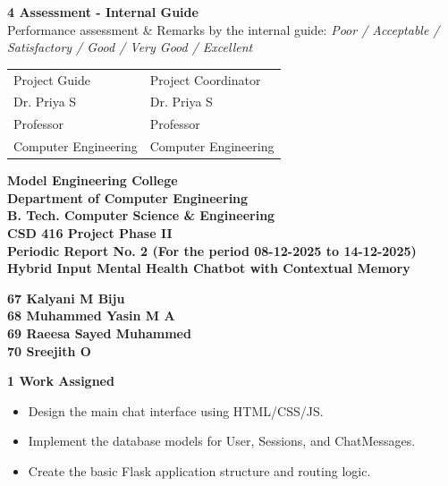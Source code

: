 \documentclass[12pt,a4paper]{article}
\begin{document}
\noindent\textbf{4 \quad Assessment - Internal Guide}\\[0.5em]
Performance assessment \& Remarks by the internal guide: \textit{Poor / Acceptable /}\\
\textit{Satisfactory / Good / Very Good / Excellent}\\[3em]

\noindent
\begin{tabular}{p{} p{}}
Project Guide & Project Coordinator\\[0.5em]
Dr. Priya S & Dr. Priya S\\
Professor & Professor\\
Computer Engineering & Computer Engineering\\
\end{tabular}

\vfill
\newpage


\begin{center}
{\Large \textbf{Model Engineering College}}\\[0.2em]
{\large \textbf{Department of Computer Engineering}}\\[0.2em]
{\large \textbf{B. Tech. Computer Science \& Engineering}}\\[0.2em]
{\large \textbf{CSD 416 Project Phase II}}\\[1em]
{\large \textbf{Periodic Report No. 2 (For the period 08-12-2025 to 14-12-2025)}}\\[1.5em]

{\Large \textbf{Hybrid Input Mental Health Chatbot with Contextual Memory}}\\[0.2em]

\end{center}

\begin{center}
\textbf{67  Kalyani M Biju\\
68 Muhammed Yasin M A\\
69 Raeesa Sayed Muhammed\\
70 Sreejith O\\[1.5em]}
\end{center}

\noindent\textbf{1 \quad Work Assigned}
\begin{itemize}
    \item Design the main chat interface using HTML/CSS/JS.
    \item Implement the database models for User, Sessions, and ChatMessages.
    \item Create the basic Flask application structure and routing logic.
\end{itemize}
\end{document}
